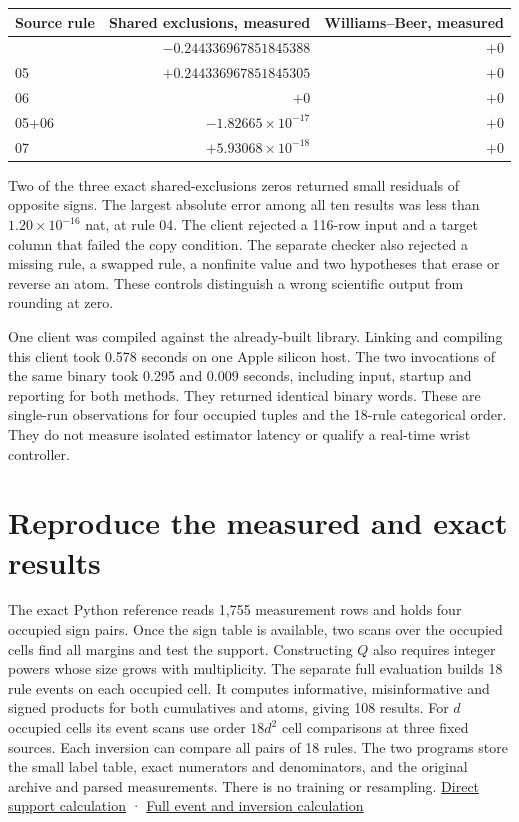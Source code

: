 {\def\LTcaptype{none} %
\begin{longtable}[]{@{}lrr@{}}
\toprule\noalign{}
Source rule & Shared exclusions, measured & Williams--Beer, measured \\
\midrule\noalign{}
\endhead
\bottomrule\noalign{}
\endlastfoot
04 & \(-0.244336967851845388\) & \(+0\) \\
05 & \(+0.244336967851845305\) & \(+0\) \\
06 & \(+0\) & \(+0\) \\
05+06 & \(-1.82665\times10^{-17}\) & \(+0\) \\
07 & \(+5.93068\times10^{-18}\) & \(+0\) \\
\end{longtable}
}

Two of the three exact shared-exclusions zeros returned small residuals of opposite signs. The largest absolute error among all ten results was less than \(1.20\times10^{-16}\) nat, at rule 04. The client rejected a 116-row input and a target column that failed the copy condition. The separate checker also rejected a missing rule, a swapped rule, a nonfinite value and two hypotheses that erase or reverse an atom. These controls distinguish a wrong scientific output from rounding at zero.

One client was compiled against the already-built library. Linking and compiling this client took 0.578 seconds on one Apple silicon host. The two invocations of the same binary took 0.295 and 0.009 seconds, including input, startup and reporting for both methods. They returned identical binary words. These are single-run observations for four occupied tuples and the 18-rule categorical order. They do not measure isolated estimator latency or qualify a real-time wrist controller.

\clearpage

\section{Reproduce the measured and exact results}\label{reproduce-the-measured-and-exact-results}

The exact Python reference reads 1,755 measurement rows and holds four occupied sign pairs. Once the sign table is available, two scans over the occupied cells find all margins and test the support. Constructing \(Q\) also requires integer powers whose size grows with multiplicity. The separate full evaluation builds 18 rule events on each occupied cell. It computes informative, misinformative and signed products for both cumulatives and atoms, giving 108 results. For \(d\) occupied cells its event scans use order \(18d^2\) cell comparisons at three fixed sources. Each inversion can compare all pairs of 18 rules. The two programs store the small label table, exact numerators and denominators, and the original archive and parsed measurements. There is no training or resampling. \href{https://github.com/sepahead/pid-rs/blob/main/audit/research/robot-wrist-copied-target/source_counts.py}{Direct support calculation} · \href{https://github.com/sepahead/pid-rs/blob/main/audit/research/robot-wrist-copied-target/check_lattice.py}{Full event and inversion calculation}

